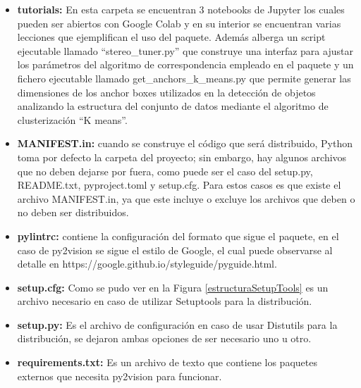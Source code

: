\begin{itemize}
   \item \textbf{tutorials:} En esta carpeta se encuentran 3 notebooks de Jupyter los cuales pueden ser abiertos con Google Colab y en su interior se encuentran varias lecciones que ejemplifican el uso del paquete. Además alberga un script ejecutable llamado ``stereo\_tuner.py'' que construye una interfaz para ajustar los parámetros del algoritmo de correspondencia empleado en el paquete y un fichero ejecutable llamado get\_anchors\_k\_means.py que permite generar las dimensiones de los anchor boxes utilizados en la detección de objetos analizando la estructura del conjunto de datos mediante el algoritmo de clusterización ``K means''.
    \item \textbf{MANIFEST.in:} cuando se construye el código que será distribuido, Python toma por defecto la carpeta del proyecto; sin embargo, hay algunos archivos que no deben dejarse por fuera, como puede ser el caso del setup.py, README.txt, pyproject.toml y setup.cfg. Para estos casos es que existe el archivo MANIFEST.in, ya que este incluye o excluye los archivos que deben o no deben ser distribuidos.
    \item \textbf{pylintrc:} contiene la configuración del formato que sigue el paquete, en el caso de py2vision se sigue el estilo de Google, el cual puede observarse al detalle en https://google.github.io/styleguide/pyguide.html.
    \item \textbf{setup.cfg:} Como se pudo ver en la Figura \ref{estructuraSetupTools} es un archivo necesario en caso de utilizar Setuptools para la distribución.
    \item \textbf{setup.py:} Es el archivo de configuración en caso de usar Distutils para la distribución, se dejaron ambas opciones de ser necesario uno u otro.
    \item \textbf{requirements.txt:} Es un archivo de texto que contiene los paquetes externos que necesita py2vision para funcionar.
\end{itemize}
